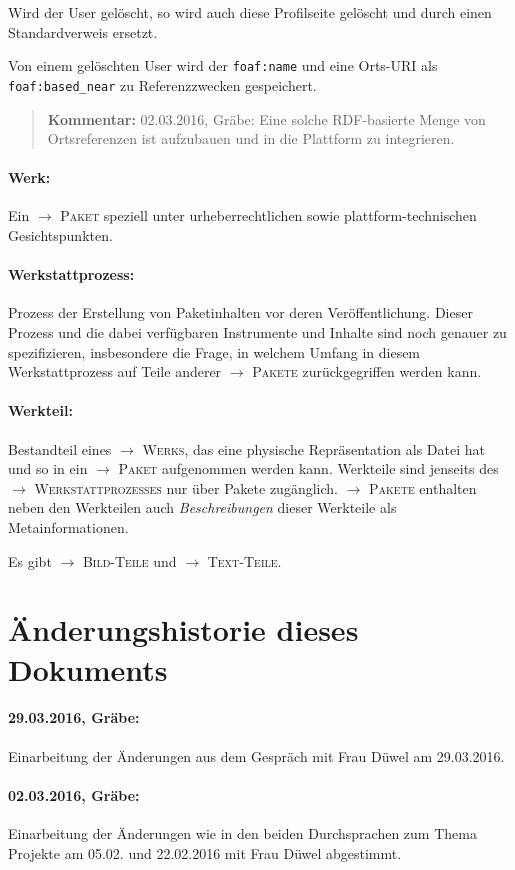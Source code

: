 \documentclass[a4paper,11pt]{article}
\newcommand{\Kommentar}[1]{
  \begin{quote}\textbf{Kommentar:} #1 \end{quote}
}
\newcommand{\glossar}[1]{{$\to$ \textsc{#1}}}
\begin{document}
Wird der User gelöscht, so wird auch diese Profilseite gelöscht und durch
einen Standardverweis ersetzt. 

Von einem gelöschten User wird der \texttt{foaf:name} und eine Orts-URI als
\texttt{foaf:based\_near} zu Referenzzwecken gespeichert.

\Kommentar{02.03.2016, Gräbe: Eine solche RDF-basierte Menge von Ortsreferenzen
  ist aufzubauen und in die Plattform zu integrieren. }

\paragraph{Werk:} 
Ein \glossar{Paket} speziell unter urheberrechtlichen sowie
plattform-technischen Gesichtspunkten. 

\paragraph{Werkstattprozess:} 
Prozess der Erstellung von Paketinhalten vor deren Veröffentlichung. Dieser
Prozess und die dabei verfügbaren Instrumente und Inhalte sind noch genauer zu
spezifizieren, insbesondere die Frage, in welchem Umfang in diesem
Werkstattprozess auf Teile anderer \glossar{Pakete} zurückgegriffen werden
kann.

\paragraph{Werkteil:}
Bestandteil eines \glossar{Werks}, das eine physische Repräsentation als Datei
hat und so in ein \glossar{Paket} aufgenommen werden kann. Werkteile sind
jenseits des \glossar{Werkstattprozesses} nur über Pakete zugänglich.
\glossar{Pakete} enthalten neben den Werkteilen auch \emph{Beschreibungen}
dieser Werkteile als Metainformationen.

Es gibt \glossar{Bild-Teile} und \glossar{Text-Teile}.

\newpage
\section{Änderungshistorie dieses Dokuments}

\paragraph{29.03.2016, Gräbe:} 
Einarbeitung der Änderungen aus dem Gespräch mit Frau Düwel am 29.03.2016. 

\paragraph{02.03.2016, Gräbe:} 
Einarbeitung der Änderungen wie in den beiden Durchsprachen zum Thema Projekte
am 05.02. und 22.02.2016 mit Frau Düwel abgestimmt.  
\end{document}
